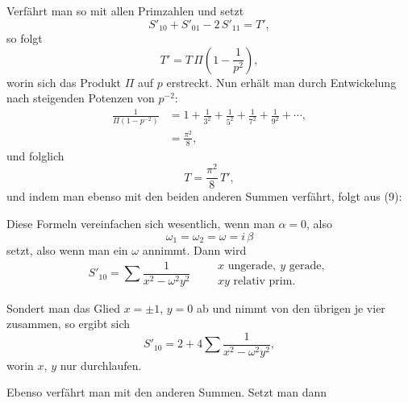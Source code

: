 
Verfährt man so mit allen Primzahlen und setzt
\[
S'_{10} + S'_{01} - 2\,S'_{11} = T',
\]
so folgt
\[
T' = T\,\Pi\left(1 - \frac{1}{p^2}\right),
\]
worin sich das Produkt $\Pi$ auf  $p$ erstreckt. Nun erhält man
durch Entwickelung nach steigenden Potenzen von $p^{-2}$:
\[
\begin{aligned}
\frac{1}{\Pi(1-p^{-2})} &= 1 + \frac{1}{3^2} + \frac{1}{5^2} + \frac{1}{7^2} + \frac{1}{9^2} + \cdots,\\
&= \frac{\pi^2}{8},
\end{aligned}
\]
und folglich
\[
T = \frac{\pi^2}{8}\,T',
\]
und indem man ebenso mit den beiden anderen Summen verfährt, folgt aus (9):

Diese Formeln vereinfachen sich wesentlich, wenn man $\alpha = 0$, also
\[
\omega_1 = \omega_2 = \omega = i\,\beta
\]
setzt, also wenn man ein  $\omega$ annimmt. Dann wird
\[
S'_{10} = \sum \frac{1}{x^2 - \omega^2 y^2} \qquad \begin{array}{l}x \text{ ungerade}, \ y \text{ gerade},\\xy \text{ relativ prim}.\end{array}
\]

Sondert man das Glied $x = \pm 1$, $y = 0$ ab und nimmt von den übrigen je vier zusammen,
so ergibt sich
\[
S'_{10} = 2 + 4\sum \frac{1}{x^2 - \omega^2 y^2},
\]
worin $x$, $y$ nur  durchlaufen.

Ebenso verfährt man mit den anderen Summen. Setzt man dann
